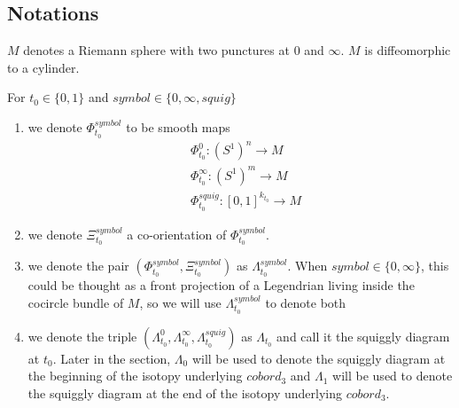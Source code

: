 \subsection*{Notations}
\begin{definition}
$M$ denotes a Riemann sphere with two punctures at $0$ and $\infty$. $M$ is diffeomorphic to a cylinder.
\end{definition}
\begin{definition}
For $t_0\in\{0,1\}$ and $symbol\in\{0,\infty, squig \}$
\begin{enumerate}
\item we denote $\Phi_{t_0}^{symbol}$ to be smooth maps
\begin{align*}
&\Phi_{t_0}^0 : (S^1)^n \rightarrow M \\
&\Phi_{t_0}^\infty : (S^1)^m \rightarrow M \\
&\Phi_{t_0}^{squig} : [0,1]^{k_{t_0}} \rightarrow M
\end{align*}

\item we denote $\Xi_{t_0}^{symbol}$ a co-orientation of $\Phi_{t_0}^{symbol}$.

\item we denote the pair $(\Phi_{t_0}^{symbol},\Xi_{t_0}^{symbol})$ as $\Lambda_{t_0}^{symbol}$. When $symbol \in \{0,\infty\}$, this could be thought as a front projection of a Legendrian living inside the cocircle bundle of $M$, so we will use $\Lambda_{t_0}^{symbol}$ to denote both

\item we denote the triple $(\Lambda_{t_0}^{0},\Lambda_{t_0}^{\infty},\Lambda_{t_0}^{squig})$ as $\Lambda_{t_0}$ and call it the squiggly diagram at $t_0$. Later in the section, $\Lambda_0$ will be used to denote the squiggly diagram at the beginning of the isotopy underlying $cobord_3$ and $\Lambda_1$ will be used to denote the squiggly diagram at the end of the isotopy underlying $cobord_3$. 
\end{enumerate}
\end{definition}

